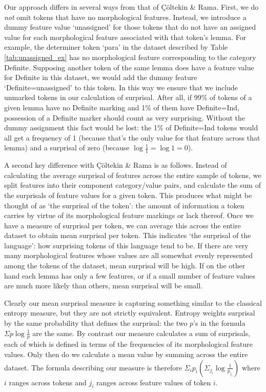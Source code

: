 \documentclass[USenglish]{article}
\begin{document}
Our approach differs in several ways from that of Çöltekin \& Rama.
First, we do \textit{not} omit tokens that have no morphological features.
Instead, we introduce a dummy feature value `unassigned' for those tokens that do not have an assigned value for each morphological feature associated with that token's lemma.
For example, the determiner token `para' in the dataset described by Table \ref{tab:unassigned_ex} has no morphological feature corresponding to the category Definite.
Supposing another token of the same lemma does have a feature value for Definite in this dataset, we would add the dummy feature `Definite=unassigned' to this token.
In this way we ensure that we include unmarked tokens in our calculation of surprisal.
After all, if 99\% of tokens of a given lemma have no Definite marking and 1\% of them have Definite=Ind, possession of a Definite marker should count as very surprising.
Without the dummy assignment this fact would be lost: the 1\% of Definite=Ind tokens would all get a frequency of 1 (because that's the only value for that feature across that lemma) and a surprisal of zero (because $\log{\frac{1}{1}}=\log{1}=0$).

A second key difference with Çöltekin \& Rama is as follows.
Instead of calculating the average surprisal of features across the entire sample of tokens, we split features into their component category/value pairs, and calculate the sum of the surprisals of feature values for a given token.
This produces what might be thought of as `the surprisal of the token': the amount of information a token carries by virtue of its morphological feature markings or lack thereof.
Once we have a measure of surprisal per token, we can average this across the entire dataset to obtain mean surprisal per token.
This indicates `the surprisal of the language': how surprising tokens of this language tend to be.
If there are very many morphological features whose values are all somewhat evenly represented among the tokens of the dataset, mean surprisal will be high.
If on the other hand each lemma has only a few features, or if a small number of feature values are much more likely than others, mean surprisal will be small.

Clearly our mean surprisal measure is capturing something similar to the classical entropy measure, but they are not strictly equivalent.
Entropy weights surprisal by the same probability that defines the surprisal: the two $p$'s in the formula $\Sigma p\log{\frac{1}{p}}$ are the same.
By contrast our measure calculates a sum of surprisals, each of which is defined in terms of the frequencies of its morphological feature values.
Only then do we calculate a mean value by summing across the entire dataset.
The formula describing our measure is therefore $\Sigma_i p_i \left( \Sigma_{j_i} \log{\frac{1}{p_{j_i}}} \right)$ where $i$ ranges across tokens and $j_i$ ranges across feature values of token $i$.
\end{document}
